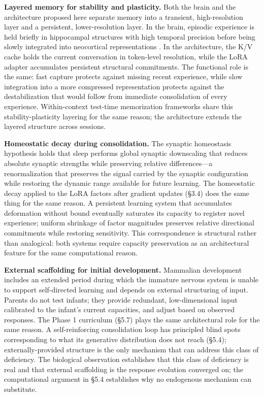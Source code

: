 \documentclass[11pt]{article}
\begin{document}
\textbf{Layered memory for stability and plasticity.} Both the brain and the architecture proposed here separate memory into a transient, high-resolution layer and a persistent, lower-resolution layer. In the brain, episodic experience is held briefly in hippocampal structures with high temporal precision before being slowly integrated into neocortical representations \cite{mcclelland1995}. In the architecture, the K/V cache holds the current conversation in token-level resolution, while the LoRA adapter accumulates persistent structural commitments. The functional role is the same: fast capture protects against missing recent experience, while slow integration into a more compressed representation protects against the destabilization that would follow from immediate consolidation of every experience. Within-context test-time memorization frameworks \cite{behrouz2024titans, behrouz2025atlas} share this stability-plasticity layering for the same reason; the architecture extends the layered structure across sessions.

\textbf{Homeostatic decay during consolidation.} The synaptic homeostasis hypothesis \cite{tononi2014} holds that sleep performs global synaptic downscaling that reduces absolute synaptic strengths while preserving relative differences---a renormalization that preserves the signal carried by the synaptic configuration while restoring the dynamic range available for future learning. The homeostatic decay applied to the LoRA factors after gradient updates (\S 3.4) does the same thing for the same reason. A persistent learning system that accumulates deformation without bound eventually saturates its capacity to register novel experience; uniform shrinkage of factor magnitudes preserves relative directional commitments while restoring sensitivity. This correspondence is structural rather than analogical: both systems require capacity preservation as an architectural feature for the same computational reason.

\textbf{External scaffolding for initial development.} Mammalian development includes an extended period during which the immature nervous system is unable to support self-directed learning and depends on external structuring of input. Parents do not test infants; they provide redundant, low-dimensional input calibrated to the infant's current capacities, and adjust based on observed responses. The Phase 1 curriculum (\S 5.7) plays the same architectural role for the same reason. A self-reinforcing consolidation loop has principled blind spots corresponding to what its generative distribution does not reach (\S 5.4); externally-provided structure is the only mechanism that can address this class of deficiency. The biological observation establishes that this class of deficiency is real and that external scaffolding is the response evolution converged on; the computational argument in \S 5.4 establishes why no endogenous mechanism can substitute.
\end{document}
